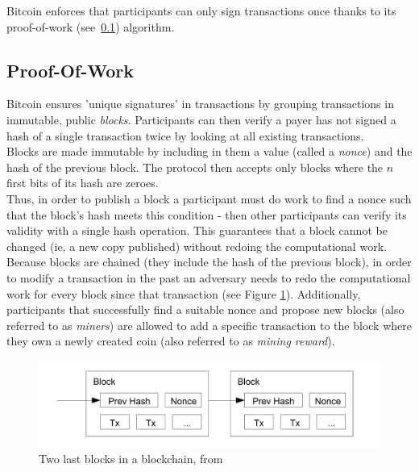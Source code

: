 Bitcoin enforces that participants can only sign transactions once thanks to its proof-of-work
(see~\ref{subsec:btc:pow}) algorithm.

\subsection{Proof-Of-Work}\label{subsec:btc:pow}

Bitcoin ensures 'unique signatures' in transactions by grouping transactions in immutable, public \textit{blocks}.
Participants can then verify a payer has not signed a hash of a single transaction twice by looking at all existing
transactions.\\

Blocks are made immutable by including in them a value (called a \textit{nonce}) and the hash of the previous block.
The protocol then accepts only blocks where the $n$ first bits of its hash are zeroes. \\

Thus, in order to publish a block a participant must do work to find a nonce such that the block's hash meets this
condition - then other participants can verify its validity with a single hash operation.
This guarantees that a block cannot be changed (ie, a new copy published) without redoing the computational work.
Because blocks are chained (they include the hash of the previous block), in order to modify a transaction in the past
an adversary needs to redo the computational work for every block since that transaction (see Figure
\ref{fig:bitcoin-blockchain}).
Additionally, participants that successfully find a suitable nonce and propose new blocks (also referred to as
\textit{miners}) are allowed to add a specific transaction to the block where they own a newly created coin (also
referred to as \textit{mining reward}).

\begin{figure}[th]
    \centering
    \includegraphics[width=0.8\columnwidth]{figures/bitcoin-blockchain}
    \caption[Two last blocks in a blockhain]{Two last blocks in a blockchain, from~\cite{nakamoto2008bitcoin}}
    \label{fig:bitcoin-blockchain}
\end{figure}

